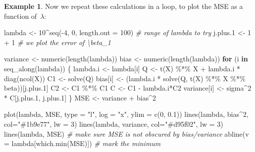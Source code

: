 \documentclass[
  a4paper,
]{article}
\newenvironment{Shaded}{\begin{snugshade}}{\end{snugshade}}
\newcommand{\AttributeTok}[1]{\textcolor[rgb]{0.77,0.63,0.00}{#1}}
\newcommand{\CommentTok}[1]{\textcolor[rgb]{0.56,0.35,0.01}{\textit{#1}}}
\newcommand{\ControlFlowTok}[1]{\textcolor[rgb]{0.13,0.29,0.53}{\textbf{#1}}}
\newcommand{\DecValTok}[1]{\textcolor[rgb]{0.00,0.00,0.81}{#1}}
\newcommand{\FloatTok}[1]{\textcolor[rgb]{0.00,0.00,0.81}{#1}}
\newcommand{\FunctionTok}[1]{\textcolor[rgb]{0.00,0.00,0.00}{#1}}
\newcommand{\NormalTok}[1]{#1}
\newcommand{\OtherTok}[1]{\textcolor[rgb]{0.56,0.35,0.01}{#1}}
\newcommand{\SpecialCharTok}[1]{\textcolor[rgb]{0.00,0.00,0.00}{#1}}
\newcommand{\StringTok}[1]{\textcolor[rgb]{0.31,0.60,0.02}{#1}}
\theoremstyle{definition}
\theoremstyle{definition}
\newtheorem{example}{Example}[section]
\theoremstyle{definition}
\theoremstyle{definition}
\theoremstyle{remark}
\begin{document}
\begin{example}
Now we repeat these calculations in a loop, to plot the MSE
as a function of~\(\lambda\):

\begin{Shaded}
\begin{Highlighting}[]
\NormalTok{lambda }\OtherTok{\textless{}{-}} \DecValTok{10}\SpecialCharTok{\^{}}\FunctionTok{seq}\NormalTok{(}\SpecialCharTok{{-}}\DecValTok{4}\NormalTok{, }\DecValTok{0}\NormalTok{, }\AttributeTok{length.out =} \DecValTok{100}\NormalTok{) }\CommentTok{\# range of lambda to try}
\NormalTok{j.plus}\FloatTok{.1} \OtherTok{\textless{}{-}} \DecValTok{1} \SpecialCharTok{+} \DecValTok{1} \CommentTok{\# we plot the error of \textbackslash{}beta\_1}

\NormalTok{variance }\OtherTok{\textless{}{-}} \FunctionTok{numeric}\NormalTok{(}\FunctionTok{length}\NormalTok{(lambda))}
\NormalTok{bias }\OtherTok{\textless{}{-}} \FunctionTok{numeric}\NormalTok{(}\FunctionTok{length}\NormalTok{(lambda))}
\ControlFlowTok{for}\NormalTok{ (i }\ControlFlowTok{in} \FunctionTok{seq\_along}\NormalTok{(lambda)) \{}
\NormalTok{    lambda.i }\OtherTok{\textless{}{-}}\NormalTok{ lambda[i]}
\NormalTok{    Q }\OtherTok{\textless{}{-}} \FunctionTok{t}\NormalTok{(X) }\SpecialCharTok{\%*\%}\NormalTok{ X }\SpecialCharTok{+}\NormalTok{ lambda.i }\SpecialCharTok{*} \FunctionTok{diag}\NormalTok{(}\FunctionTok{ncol}\NormalTok{(X))}
\NormalTok{    C1 }\OtherTok{\textless{}{-}} \FunctionTok{solve}\NormalTok{(Q)}
\NormalTok{    bias[i] }\OtherTok{\textless{}{-}}\NormalTok{ (lambda.i }\SpecialCharTok{*} \FunctionTok{solve}\NormalTok{(Q, }\FunctionTok{t}\NormalTok{(X) }\SpecialCharTok{\%*\%}\NormalTok{ X }\SpecialCharTok{\%*\%}\NormalTok{ beta))[j.plus}\FloatTok{.1}\NormalTok{]}
\NormalTok{    C2 }\OtherTok{\textless{}{-}}\NormalTok{ C1 }\SpecialCharTok{\%*\%}\NormalTok{ C1}
\NormalTok{    C }\OtherTok{\textless{}{-}}\NormalTok{ C1 }\SpecialCharTok{{-}}\NormalTok{ lambda.i}\SpecialCharTok{*}\NormalTok{C2}
\NormalTok{    variance[i] }\OtherTok{\textless{}{-}}\NormalTok{ sigma}\SpecialCharTok{\^{}}\DecValTok{2} \SpecialCharTok{*}\NormalTok{ C[j.plus}\FloatTok{.1}\NormalTok{, j.plus}\FloatTok{.1}\NormalTok{]}
\NormalTok{\}}
\NormalTok{MSE }\OtherTok{\textless{}{-}}\NormalTok{ variance }\SpecialCharTok{+}\NormalTok{ bias}\SpecialCharTok{\^{}}\DecValTok{2}

\FunctionTok{plot}\NormalTok{(lambda, MSE, }\AttributeTok{type =} \StringTok{"l"}\NormalTok{, }\AttributeTok{log =} \StringTok{"x"}\NormalTok{, }\AttributeTok{ylim =} \FunctionTok{c}\NormalTok{(}\DecValTok{0}\NormalTok{, }\FloatTok{0.1}\NormalTok{))}
\FunctionTok{lines}\NormalTok{(lambda, bias}\SpecialCharTok{\^{}}\DecValTok{2}\NormalTok{, }\AttributeTok{col=}\StringTok{"\#1b9e77"}\NormalTok{, }\AttributeTok{lw =} \DecValTok{3}\NormalTok{)}
\FunctionTok{lines}\NormalTok{(lambda, variance, }\AttributeTok{col=}\StringTok{"\#d95f02"}\NormalTok{, }\AttributeTok{lw =} \DecValTok{3}\NormalTok{)}
\FunctionTok{lines}\NormalTok{(lambda, MSE) }\CommentTok{\# make sure MSE is not obscured by bias/variance}
\FunctionTok{abline}\NormalTok{(}\AttributeTok{v =}\NormalTok{ lambda[}\FunctionTok{which.min}\NormalTok{(MSE)]) }\CommentTok{\# mark the minimum}


\end{Highlighting}
\end{Shaded}
\end{example}
\end{document}
